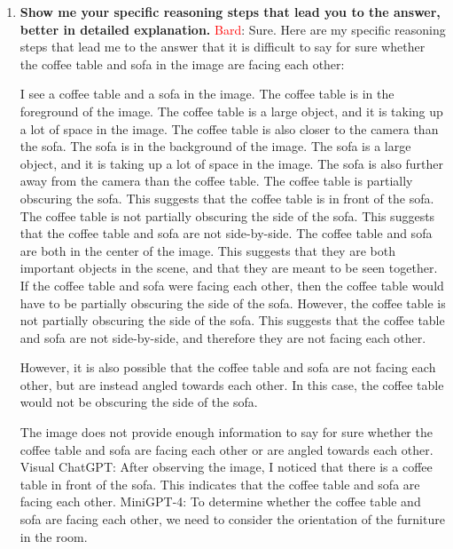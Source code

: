 \begin{enumerate}
    Based on these clues, it is possible that the coffee table and sofa in the image are facing each other. However, it is also possible that they are not. The image does not provide enough information to say for sure.
    \subitem Visual ChatGPT: The woman is standing in front of the mirror.
    \subitem MiniGPT-4: No, the coffee table and sofa are not facing each other. The coffee table is positioned in front of the sofa, and the sofa is positioned next to the coffee table.
    \item \textbf{Show me your specific reasoning steps that lead you to the answer, better in detailed explanation.}
    \subitem \textcolor{Red}{Bard}: 
    Sure. Here are my specific reasoning steps that lead me to the answer that it is difficult to say for sure whether the coffee table and sofa in the image are facing each other:
    
    I see a coffee table and a sofa in the image.
    The coffee table is in the foreground of the image. The coffee table is a large object, and it is taking up a lot of space in the image. The coffee table is also closer to the camera than the sofa.
    The sofa is in the background of the image. The sofa is a large object, and it is taking up a lot of space in the image. The sofa is also further away from the camera than the coffee table.
    The coffee table is partially obscuring the sofa. This suggests that the coffee table is in front of the sofa.
    The coffee table is not partially obscuring the side of the sofa. This suggests that the coffee table and sofa are not side-by-side.
    The coffee table and sofa are both in the center of the image. This suggests that they are both important objects in the scene, and that they are meant to be seen together.
    If the coffee table and sofa were facing each other, then the coffee table would have to be partially obscuring the side of the sofa. However, the coffee table is not partially obscuring the side of the sofa. This suggests that the coffee table and sofa are not side-by-side, and therefore they are not facing each other.
    
    However, it is also possible that the coffee table and sofa are not facing each other, but are instead angled towards each other. In this case, the coffee table would not be obscuring the side of the sofa.
    
    The image does not provide enough information to say for sure whether the coffee table and sofa are facing each other or are angled towards each other.
    \subitem Visual ChatGPT: After observing the image, I noticed that there is a coffee table in front of the sofa. This indicates that the coffee table and sofa are facing each other.
    \subitem MiniGPT-4: To determine whether the coffee table and sofa are facing each other, we need to consider the orientation of the furniture in the room.


\end{enumerate}
